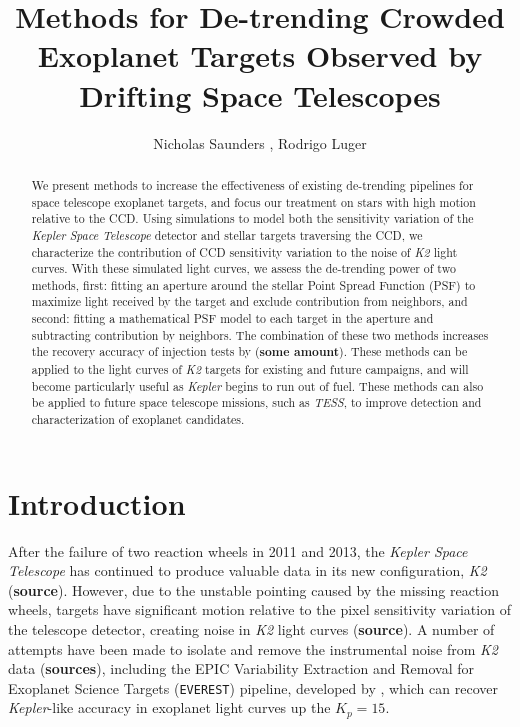 \documentclass[12pt,preprint]{aastex}
\begin{document}
\title{
	Methods for De-trending Crowded Exoplanet Targets Observed by Drifting Space Telescopes
}

\author{Nicholas Saunders , Rodrigo Luger }



\begin{abstract}

We present methods to increase the effectiveness of existing de-trending pipelines for space telescope exoplanet targets, and focus our treatment on stars with high motion relative to the CCD. Using simulations to model both the sensitivity variation of the \textit{Kepler Space Telescope} detector and stellar targets traversing the CCD, we characterize the contribution of CCD sensitivity variation to the noise of \textit{K2} light curves. With these simulated light curves, we assess the de-trending power of two methods, first: fitting an aperture around the stellar Point Spread Function (PSF) to maximize light received by the target and exclude contribution from neighbors, and second: fitting a mathematical PSF model to each target in the aperture and subtracting contribution by neighbors. The combination of these two methods increases the recovery accuracy of injection tests by (\textbf{some amount}). These methods can be applied to the light curves of \textit{K2} targets for existing and future campaigns, and will become particularly useful as \textit{Kepler} begins to run out of fuel. These methods can also be applied to future space telescope missions, such as \textit{TESS}, to improve detection and characterization of exoplanet candidates.

\end{abstract}

\section{Introduction}

After the failure of two reaction wheels in 2011 and 2013, the \textit{Kepler Space Telescope} has continued to produce valuable data in its new configuration, \textit{K2} (\textbf{source}). However, due to the unstable pointing caused by the missing reaction wheels, targets have significant motion relative to the pixel sensitivity variation of the telescope detector, creating noise in \textit{K2} light curves (\textbf{source}). A number of attempts have been made to isolate and remove the instrumental noise from \textit{K2} data (\textbf{sources}), including the EPIC Variability Extraction and Removal for Exoplanet Science Targets (\texttt{EVEREST}) pipeline, developed by \cite{2017arXiv170205488L}, which can recover \textit{Kepler}-like accuracy in exoplanet light curves up the $K_p = 15$.
\end{document}
